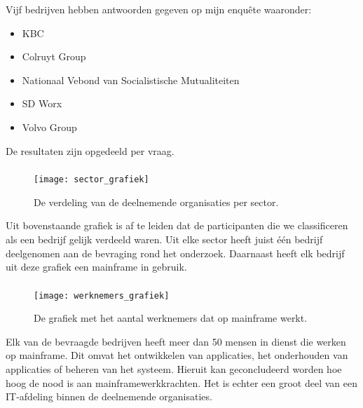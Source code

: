 Vijf bedrijven hebben antwoorden gegeven op mijn enquête waaronder: 
 \begin{itemize}
    \item KBC
    \item Colruyt Group
    \item Nationaal Vebond van Socialistische Mutualiteiten
    \item SD Worx
    \item Volvo Group
\end{itemize}

De resultaten zijn opgedeeld per vraag. 

 \subsubsection{}
\label{sec:In welke sector is het bedrijf actief}

 \begin{figure}[h]
    \centering
    \texttt{[image: sector\_grafiek]}
    \caption{De verdeling van de deelnemende organisaties per sector.}
\end{figure}

Uit bovenstaande grafiek is af te leiden dat de participanten die we classificeren als een bedrijf gelijk verdeeld waren. Uit elke sector heeft juist één bedrijf deelgenomen aan de bevraging rond het onderzoek. Daarnaast heeft elk bedrijf uit deze grafiek een mainframe in gebruik. 

\newpage

 \subsubsection{}
\label{sec:Wat is het aantal van werknemers die werk leveren dat te maken heeft met het ontwikkelen, onderhouden of beheren van een mainframe?}

 \begin{figure}[h]
    \centering
    \texttt{[image: werknemers\_grafiek]}
    \caption{De grafiek met het aantal werknemers dat op mainframe werkt.}
\end{figure}

Elk van de bevraagde bedrijven heeft meer dan 50 mensen in dienst die werken op mainframe. Dit omvat het ontwikkelen van applicaties, het onderhouden van applicaties of beheren van het systeem. Hieruit kan geconcludeerd worden hoe hoog de nood is aan mainframewerkkrachten. Het is echter een groot deel van een IT-afdeling binnen de deelnemende organisaties.

